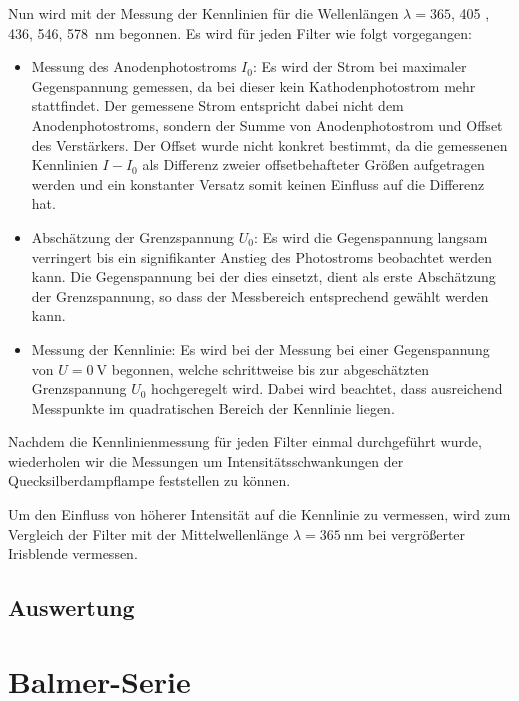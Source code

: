 \documentclass[11pt, a4paper]{article}
\numberwithin{equation}{section}
\begin{document}
Nun wird mit der Messung der Kennlinien für die Wellenlängen $\lambda = \num{365}$, \num{405} , \num{436}, \num{546}, \SI{578}{\nano\metre} begonnen.
Es wird für jeden Filter wie folgt vorgegangen:
\begin{itemize}
  \item Messung des Anodenphotostroms $I_0$: Es wird der Strom bei maximaler Gegenspannung gemessen, da bei dieser kein Kathodenphotostrom mehr stattfindet.
  Der gemessene Strom entspricht dabei nicht dem Anodenphotostroms, sondern der Summe von Anodenphotostrom und Offset des Verstärkers.
  Der Offset wurde nicht konkret bestimmt, da die gemessenen Kennlinien $I-I_0$ als Differenz zweier offsetbehafteter Größen aufgetragen werden und ein konstanter Versatz somit keinen Einfluss auf die Differenz hat. 
  \item Abschätzung der Grenzspannung $U_0$: Es wird die Gegenspannung langsam verringert bis ein signifikanter Anstieg des Photostroms beobachtet werden kann.
  Die Gegenspannung bei der dies einsetzt, dient als erste Abschätzung der Grenzspannung, so dass der Messbereich entsprechend gewählt werden kann.
  \item Messung der Kennlinie: Es wird bei der Messung bei einer Gegenspannung von $U = \SI{0}{\volt}$ begonnen, welche schrittweise bis zur abgeschätzten Grenzspannung $U_0$ hochgeregelt wird. Dabei wird beachtet, dass ausreichend Messpunkte im quadratischen Bereich der Kennlinie liegen.
\end{itemize}
Nachdem die Kennlinienmessung für jeden Filter einmal durchgeführt wurde, wiederholen wir die Messungen um Intensitätsschwankungen der Quecksilberdampflampe feststellen zu können.


Um den Einfluss von höherer Intensität auf die Kennlinie zu vermessen, wird zum Vergleich der Filter mit der Mittelwellenlänge $\lambda = \SI{365}{\nano\metre}$ bei vergrößerter Irisblende vermessen.



\subsection{Auswertung}


\section{Balmer-Serie}
\end{document}
